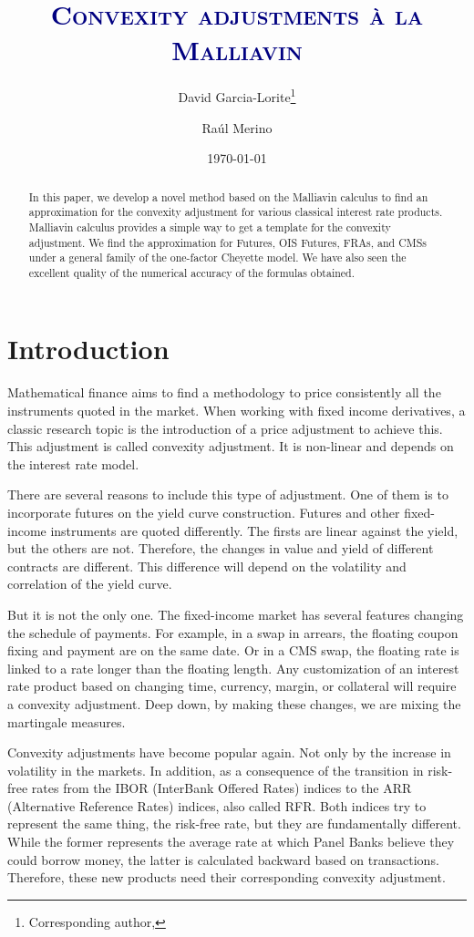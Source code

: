 \documentclass[a4paper,10pt]{article}
\title{\textcolor{Navy}{\textsc{Convexity adjustments \`a la Malliavin}}}
\author[1,2]{David Garcia-Lorite\thanks{Corresponding author, \email{dddd@caixabank.es}}}
\author[3]{Ra\'{u}l Merino}
\affil[1]{CaixaBank, Quantitative Analyst Team, Plaza de Castilla, 3, 28046 Madrid, Spain,}
\affil[2]{Facultat de Matem\`{a}tiques i Inform\`{a}tica, Universitat de Barcelona, \authorcr Gran Via 585, 08007 Barcelona, Spain,\vspace*{3pt}}
\affil[3]{VidaCaixa S.A., Market Risk Management Unit, \authorcr C/Juan Gris, 2-8, 08014 Barcelona, Spain.}
\date{\normalfont\small\today}
\newcommand{\TODO}[1]{\textbf{\color{red}TODO: {#1}}\PackageWarning{TODO:}{#1!}}
\newcommand{\1}{\mathbf{1}}
\newcommand{\ccode}[2]{\par
        \vspace*{8pt}
        {{\leftskip18pt\rightskip\leftskip
        \noindent{\it #1}\/: #2\par}}\par}
\newcommand{\keywords}[1]{\ccode{Keywords}{#1}}
\begin{document}
\maketitle
\begin{abstract}
In this paper, we develop a novel method based on the Malliavin calculus to find an approximation for the convexity adjustment for various classical interest rate products. Malliavin calculus provides a simple way to get a template for the convexity adjustment. We find the approximation for Futures, OIS Futures, FRAs, and CMSs under a general family of the one-factor Cheyette model. We have also seen the excellent quality of the numerical accuracy of the formulas obtained.
\end{abstract}


\section{Introduction}
Mathematical finance aims to find a methodology to price consistently all the instruments quoted in the market. When working with fixed income derivatives, a classic research topic is the introduction of a price adjustment to achieve this. This adjustment is called convexity adjustment. It is non-linear and depends on the interest rate model.  

There are several reasons to include this type of adjustment. One of them is to incorporate futures on the yield curve construction. Futures and other fixed-income instruments are quoted differently. The firsts are linear against the yield, but the others are not. Therefore, the changes in value and yield of different contracts are different. This difference will depend on the volatility and correlation of the yield curve.

But it is not the only one. The fixed-income market has several features changing the schedule of payments. For example, in a swap in arrears, the floating coupon fixing and payment are on the same date. Or in a CMS swap, the floating rate is linked to a rate longer than the floating length. Any customization of an interest rate product based on changing time, currency, margin, or collateral will require a convexity adjustment. Deep down, by making these changes, we are mixing the martingale measures. 

Convexity adjustments have become popular again. Not only by the increase in volatility in the markets. In addition, as a consequence of the transition in risk-free rates from the IBOR (InterBank Offered Rates) indices to the ARR (Alternative Reference Rates) indices, also called RFR. Both indices try to represent the same thing, the risk-free rate, but they are fundamentally different. While the former represents the average rate at which Panel Banks believe they could borrow money, the latter is calculated backward based on transactions. Therefore, these new products need their corresponding convexity adjustment. 
\end{document}
